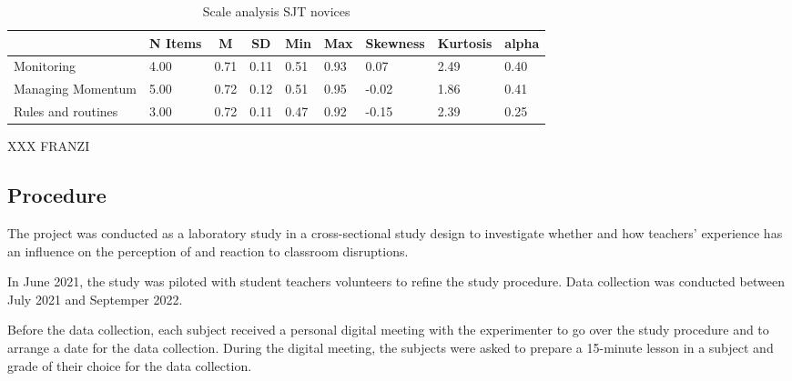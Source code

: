 \documentclass[
  man]{apa6}
\begin{document}
\begin{table}[h]

\begin{center}
\begin{threeparttable}

\caption{\label{tab:sjt}Scale analysis SJT novices}

\tiny{

\begin{tabular}{lllllllll}
\toprule
 & \multicolumn{1}{c}{N Items} & \multicolumn{1}{c}{M} & \multicolumn{1}{c}{SD} & \multicolumn{1}{c}{Min} & \multicolumn{1}{c}{Max} & \multicolumn{1}{c}{Skewness} & \multicolumn{1}{c}{Kurtosis} & \multicolumn{1}{c}{alpha}\\
\midrule
Monitoring & 4.00 & 0.71 & 0.11 & 0.51 & 0.93 & 0.07 & 2.49 & 0.40\\
Managing Momentum & 5.00 & 0.72 & 0.12 & 0.51 & 0.95 & -0.02 & 1.86 & 0.41\\
Rules and routines & 3.00 & 0.72 & 0.11 & 0.47 & 0.92 & -0.15 & 2.39 & 0.25\\
\bottomrule
\end{tabular}

}

\end{threeparttable}
\end{center}

\end{table}

XXX FRANZI

\subsection{Procedure}\label{procedure}

The project was conducted as a laboratory study in a cross-sectional study design to investigate whether and how teachers' experience has an influence on the perception of and reaction to classroom disruptions.

In June 2021, the study was piloted with student teachers volunteers to refine the study procedure. Data collection was conducted between July 2021 and Septemper 2022.

Before the data collection, each subject received a personal digital meeting with the experimenter to go over the study procedure and to arrange a date for the data collection. During the digital meeting, the subjects were asked to prepare a 15-minute lesson in a subject and grade of their choice for the data collection.
\end{document}

